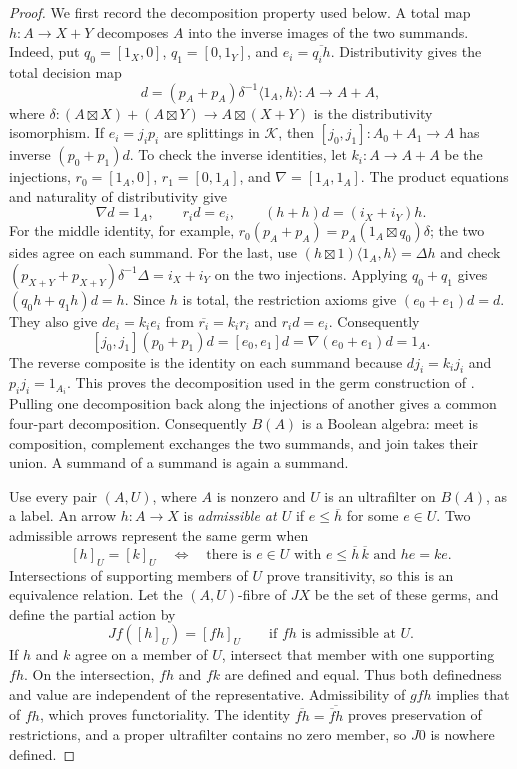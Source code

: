 \documentclass[11pt]{article}
\theoremstyle{definition}
\begin{document}
\begin{proof}
We first record the decomposition property used below. A total map
$h:A\to X+Y$ decomposes $A$ into the inverse images of the two
summands. Indeed, put $q_0=[1_X,0]$, $q_1=[0,1_Y]$, and
$e_i=\overline{q_i h}$. Distributivity gives the total decision map
\[
 d=(p_A+p_A)\delta^{-1}\langle1_A,h\rangle:A\longrightarrow A+A,
\]
where $\delta:(A\boxtimes X)+(A\boxtimes Y)\to
A\boxtimes(X+Y)$ is the distributivity isomorphism. If
$e_i=j_i p_i$ are splittings in $\mathcal K$, then
$[j_0,j_1]:A_0+A_1\to A$ has inverse $(p_0+p_1)d$.
To check the inverse identities, let $k_i:A\to A+A$ be the
injections, $r_0=[1_A,0]$, $r_1=[0,1_A]$, and
$\nabla=[1_A,1_A]$. The product equations and naturality of
distributivity give
\[
 \nabla d=1_A,\qquad r_i d=e_i,\qquad
 (h+h)d=(i_X+i_Y)h.
\]
For the middle identity, for example,
$r_0(p_A+p_A)=p_A(1_A\boxtimes q_0)\delta$; the two sides
agree on each summand. For the last, use
$(h\boxtimes1)\langle1_A,h\rangle=\Delta h$ and check
$(p_{X+Y}+p_{X+Y})\delta^{-1}\Delta=i_X+i_Y$ on the
two injections. Applying $q_0+q_1$ gives
$(q_0h+q_1h)d=h$. Since $h$ is total, the restriction axioms
give $(e_0+e_1)d=d$. They also give $de_i=k_i e_i$ from
$\overline{r_i}=k_i r_i$ and $r_i d=e_i$.
Consequently
\[
 [j_0,j_1](p_0+p_1)d=[e_0,e_1]d
       =\nabla(e_0+e_1)d=1_A.
\]
The reverse composite is the identity on each summand because
$dj_i=k_i j_i$ and $p_i j_i=1_{A_i}$.
This proves the decomposition used in the germ construction
of \cite[Appendix A]{Representation}.
Pulling one decomposition back along the injections of another gives
a common four-part decomposition. Consequently $B(A)$ is a Boolean
algebra: meet is composition, complement exchanges the two summands,
and join takes their union. A summand of a summand is again a summand.

Use every pair $(A,U)$, where $A$ is nonzero and $U$ is an
ultrafilter on $B(A)$, as a label. An arrow $h:A\to X$ is \emph{admissible at $U$}
if $e\leq\overline h$ for some $e\in U$. Two admissible arrows
represent the same germ when
\[
 [h]_U=[k]_U
 \quad\Longleftrightarrow\quad
 \text{there is }e\in U\text{ with }
 e\leq\overline h\,\overline k\text{ and }he=ke.
\]
Intersections of supporting members of $U$ prove transitivity, so
this is an equivalence relation. Let the $(A,U)$-fibre of $JX$ be
the set of these germs, and define the partial action by
\[
 Jf([h]_U)=[fh]_U
 \qquad\text{if }fh\text{ is admissible at }U.
\]
If $h$ and $k$ agree on a member of $U$, intersect that member with
one supporting $fh$. On the intersection, $fh$ and $fk$ are defined
and equal. Thus both definedness and value are independent of the
representative. Admissibility of $gfh$ implies that of $fh$, which
proves functoriality. The identity
$\overline{fh}=\overline{\overline f h}$ proves preservation of
restrictions, and a proper ultrafilter contains no zero member, so
$J0$ is nowhere defined.


\end{proof}
\end{document}
